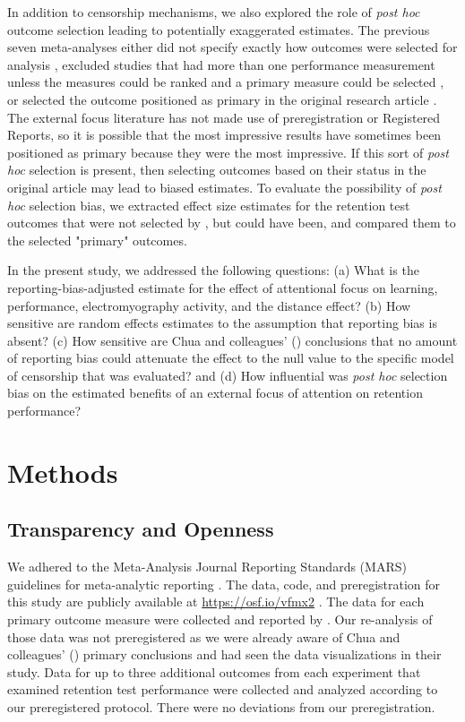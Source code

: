 \documentclass[man,floatsintext,letterpaper,12pt]{apa7}
\begin{document}
In addition to censorship mechanisms, we also explored the role of \emph{post hoc} outcome selection leading to potentially exaggerated estimates. The previous seven meta-analyses either did not specify exactly how outcomes were selected for analysis \autocite{grgic2021,grgic2022,kim2017,makaruk2020,li2022}, excluded studies that had more than one performance measurement unless the measures could be ranked and a primary measure could be selected \autocite{nicklas2022}, or selected the outcome positioned as primary in the original research article \autocite{chua2021}. The external focus literature has not made use of preregistration or Registered Reports, so it is possible that the most impressive results have sometimes been positioned as primary because they were the most impressive. If this sort of \emph{post hoc} selection is present, then selecting outcomes based on their status in the original article may lead to biased estimates. To evaluate the possibility of \emph{post hoc} selection bias, we extracted effect size estimates for the retention test outcomes that were not selected by \textcite{chua2021}, but could have been, and compared them to the selected "primary" outcomes.

In the present study, we addressed the following questions: (a) What is the reporting-bias-adjusted estimate for the effect of attentional focus on learning, performance, electromyography activity, and the distance effect? (b) How sensitive are random effects estimates to the assumption that reporting bias is absent? (c) How sensitive are Chua and colleagues' (\citeyear{chua2021}) conclusions that no amount of reporting bias could attenuate the effect to the null value to the specific model of censorship that was evaluated? and (d) How influential was \emph{post hoc} selection bias on the estimated benefits of an external focus of attention on retention performance?

\section{Methods}

\subsection{Transparency and Openness}

We adhered to the Meta-Analysis Journal Reporting Standards (MARS) guidelines for meta-analytic reporting \autocite{appelbaum2018}. The data, code, and preregistration for this study are publicly available at \url{https://osf.io/vfmx2} \autocite{mckay-carter2024}.\footnotemark{} The data for each primary outcome measure were collected and reported by \textcite{chua2021}. Our re-analysis of those data was not preregistered as we were already aware of Chua and colleagues' (\citeyear{chua2021}) primary conclusions and had seen the data visualizations in their study. Data for up to three additional outcomes from each experiment that examined retention test performance were collected and analyzed according to our preregistered protocol. There were no deviations from our preregistration.
\end{document}
